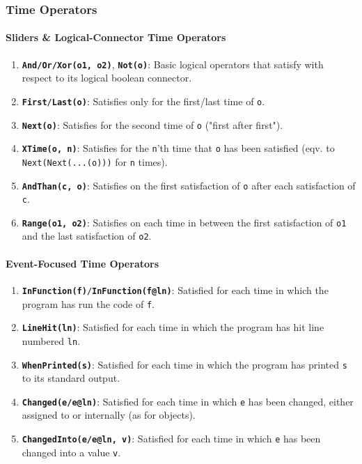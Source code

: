 \documentclass[sigconf,review]{acmart}
\begin{document}
    \subsubsection{Time Operators}

    \paragraph{Sliders \& Logical-Connector Time Operators}
    \begin{enumerate}
        \item \texttt{\textbf{And/Or/Xor(o1, o2)}}, \texttt{\textbf{Not(o)}}: Basic logical operators that satisfy with respect to its logical boolean connector.
        \item \texttt{\textbf{First}/\textbf{Last(o)}}: Satisfies only for the first/last time of \texttt{o}.
        \item \texttt{\textbf{Next(o)}}: Satisfies for the second time of \texttt{o} ("first after first").
        \item \texttt{\textbf{XTime(o, n)}}: Satisfies for the \texttt{n}'th time that \texttt{o} has been satisfied (eqv. to \texttt{Next(Next(...(o)))} for \texttt{n} times).
        \item \texttt{\textbf{AndThan(c, o)}}: Satisfies on the first satisfaction of \texttt{o} after each satisfaction of \texttt{c}.
        \item \texttt{\textbf{Range(o1, o2)}}: Satisfies on each time in between the first satisfaction of \texttt{o1} and the last satisfaction of \texttt{o2}.
    \end{enumerate}

    \paragraph{Event-Focused Time Operators}
    \begin{enumerate}
        \item \texttt{\textbf{InFunction(f)}/\textbf{InFunction(f@ln)}}: Satisfied for each time in which the program has run the code of \texttt{f}.
        \item \texttt{\textbf{LineHit(ln)}}: Satisfied for each time in which the program has hit line numbered \texttt{ln}.
        \item \texttt{\textbf{WhenPrinted(s)}}: Satisfied for each time in which the program has printed \texttt{s} to its standard output.
        \item \texttt{\textbf{Changed(e/e@ln)}}: Satisfied for each time in which \texttt{e} has been changed, either assigned to or internally (as for objects).
        \item \texttt{\textbf{ChangedInto(e/e@ln, v)}}: Satisfied for each time in which \texttt{e} has been changed into a value \texttt{v}.
    \end{enumerate}
\end{document}
